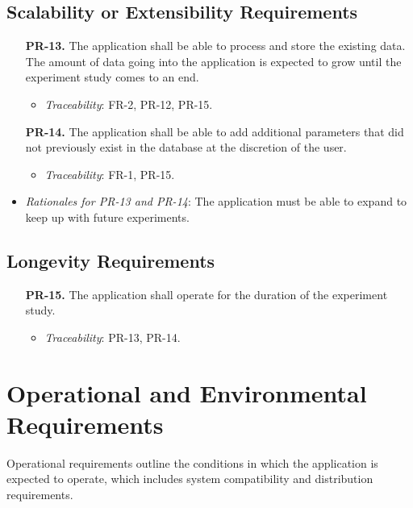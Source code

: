 \documentclass[12pt]{article}
\begin{document}
\subsection{Scalability or Extensibility Requirements}
\begin{enumerate}
  \item[\textbf{PR-13.}] The application shall be able to process and store the existing data. The amount of data going into the application is expected to grow until the experiment study comes to an end.
    \begin{itemize}
      \item \textit{Traceability}: FR-2, PR-12, PR-15.
    \end{itemize}
  \item[\textbf{PR-14.}] The application shall be able to add additional parameters that did not previously exist in the database at the discretion of the user.
    \begin{itemize}
      \item \textit{Traceability}: FR-1, PR-15.
    \end{itemize}
\end{enumerate}
\begin{itemize}
  \item \textit{Rationales for PR-13 and PR-14}: The application must be able to expand to keep up with future experiments.
\end{itemize}

\subsection{Longevity Requirements}
\begin{enumerate}
  \item[\textbf{PR-15.}] The application shall operate for the duration of the experiment study.
  \begin{itemize}
    \item \textit{Traceability}: PR-13, PR-14.
  \end{itemize}
\end{enumerate}

\section{Operational and Environmental Requirements}
Operational requirements outline the conditions in which the application is expected to operate, which includes system compatibility and distribution requirements.
\end{document}
